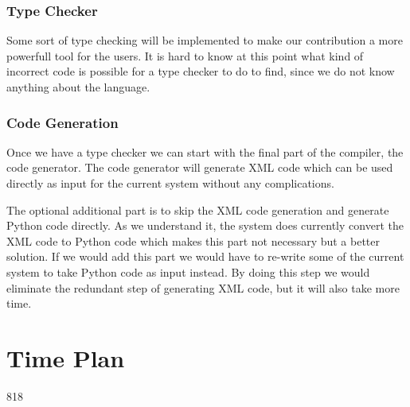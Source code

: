 \documentclass[a4paper]{article}
\begin{document}
\subsubsection{Type Checker}
Some sort of type checking will be implemented to make our
contribution a more powerfull tool for the users. It is hard to know
at this point what kind of incorrect code is possible for a type
checker to do to find, since we do not know anything about the
language.

\subsubsection{Code Generation}
Once we have a type checker we can start with the final part of the
compiler, the code generator. The code generator will generate XML
code which can be used directly as input for the current system
without any complications.

The optional additional part is to skip the XML code generation and
generate Python code directly. As we understand it, the system does
currently convert the XML code to Python code which makes this part
not necessary but a better solution. If we would add this part we
would have to re-write some of the current system to take Python code
as input instead. By doing this step we would eliminate the redundant
step of generating XML code, but it will also take more time.


\section{Time Plan}
\begin{gantt}[
    xunitlength=0.5cm,
    fontsize=\small,
    titlefontsize=\small,
    drawledgerline=true]
  {8}{18}
  \begin{ganttitle}
  \end{ganttitle}
  \begin{ganttitle}
  \end{ganttitle}
\end{gantt}
\end{document}
